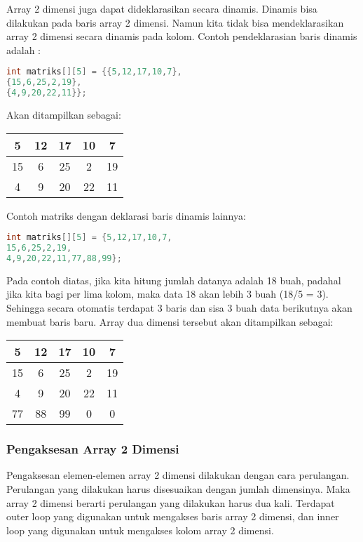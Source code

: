 Array 2 dimensi juga dapat dideklarasikan secara dinamis. Dinamis bisa
dilakukan pada baris array 2 dimensi. Namun kita tidak bisa
mendeklarasikan array 2 dimensi secara dinamis pada kolom. Contoh
pendeklarasian baris dinamis adalah :

\begin{lstlisting}[language=c++, numbers=none]
int matriks[][5] = {{5,12,17,10,7},
{15,6,25,2,19},
{4,9,20,22,11}};
\end{lstlisting}

Akan ditampilkan sebagai:

\begin{tabular}{|c|c|c|c|c|}
\hline
5&12&17&10&7 \\ \hline
15&6&25&2&19 \\ \hline
4&9&20&22&11 \\ \hline
\end{tabular}


Contoh matriks dengan deklarasi baris dinamis lainnya:

\begin{lstlisting}[language=c++, numbers=none]
int matriks[][5] = {5,12,17,10,7,
15,6,25,2,19,
4,9,20,22,11,77,88,99};
\end{lstlisting}

Pada contoh diatas, jika kita hitung jumlah datanya adalah 18 buah,
padahal jika kita bagi per lima kolom, maka data 18 akan lebih 3 buah
(18/5 = 3). Sehingga secara otomatis terdapat 3 baris dan sisa 3 buah
data berikutnya akan membuat baris baru. Array dua dimensi tersebut akan
ditampilkan sebagai:


\begin{tabular}{|c|c|c|c|c|}
\hline
5 & 12 & 17 & 10 & 7 \\ \hline
15 & 6 & 25 & 2 & 19 \\ \hline
4 & 9 & 20 & 22 & 11 \\ \hline
77 & 88 & 99 & 0 & 0 \\ \hline

\end{tabular}

\subsubsection{Pengaksesan Array 2 Dimensi}\label{pengaksesan-array-2-dimensi}

Pengaksesan elemen-elemen array 2 dimensi dilakukan dengan cara
perulangan. Perulangan yang dilakukan harus disesuaikan dengan jumlah
dimensinya. Maka array 2 dimensi berarti perulangan yang dilakukan harus
dua kali. Terdapat outer loop yang digunakan untuk mengakses baris array
2 dimensi, dan inner loop yang digunakan untuk mengakses kolom array 2
dimensi.

